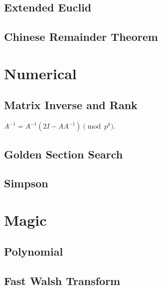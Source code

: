 \documentclass{article}
\begin{document}
    \subsection{Extended Euclid}
        
    \subsection{Chinese Remainder Theorem}
        
\section{Numerical}
    \subsection{Matrix Inverse and Rank}
        $A^{-1}=A^{-1}(2I-AA^{-1})\pmod{p^k}$.
        
    \subsection{Golden Section Search}
        
    \subsection{Simpson}
        
\section{Magic}
    \subsection{Polynomial}
        
    \subsection{Fast Walsh Transform}
        
\end{document}
